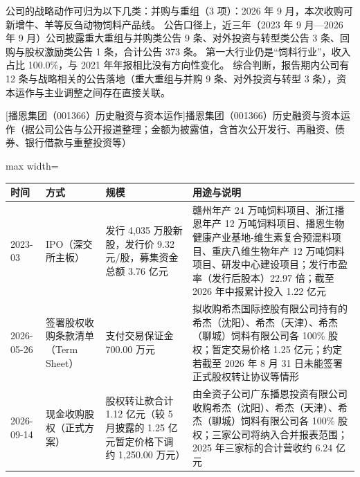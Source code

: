  公司的战略动作可归为以下几类：并购与重组（3 项）：2026 年 9 月，本次收购可新增牛、羊等反刍动物饲料产品线。 公告口径上，近三年（2023 年 9 月---2026 年 9 月）公司披露重大重组与并购类公告 9 条、对外投资与转型类公告 3 条、回购与股权激励类公告 1 条，合计公告 373 条。 第一大行业仍是“饲料行业”，收入占比 100.0\%，与 2021 年年报相比没有方向性变化。 综合判断，报告期内公司有 12 条与战略相关的公告落地（重大重组与并购 9 条、对外投资与转型 3 条），资本运作与主业调整之间存在直接关联。

\begin{center}\small\setlength{\tabcolsep}{4pt}
[播恩集团（001366）历史融资与资本运作]{播恩集团（001366）历史融资与资本运作（据公司公告与公开报道整理；金额为披露值，含首次公开发行、再融资、债券、银行借款与重整投资等）}
\begin{adjustbox}{max width=\textwidth}
\begin{tabular}{@{}p{1.45cm}p{2.55cm}p{4.05cm}p{4.95cm}@{}}
\toprule
时间 & 方式 & 规模 & 用途与说明 \\
\midrule
2023-03 & IPO（深交所主板） & 发行 4,\allowbreak{}035 万股新股，\allowbreak{}发行价 9.32 元/\allowbreak{}股，\allowbreak{}募集资金总额 3.76 亿元 & 赣州年产 24 万吨饲料项目、\allowbreak{}浙江播恩年产 12 万吨饲料项目、\allowbreak{}播恩生物健康产业基地-维生素复合预混料项目、\allowbreak{}重庆八维生物年产 12 万吨饲料项目、\allowbreak{}研发中心建设项目；发行市盈率（发行后股本）22.97 倍；截至 2026 年中报累计投入 1.22 亿元 \\
2026-05-26 & 签署股权收购条款清单（Term Sheet） & 支付交易保证金 700.00 万元 & 拟收购希杰国际控股有限公司持有的希杰（沈阳）、\allowbreak{}希杰（天津）、\allowbreak{}希杰（聊城）饲料有限公司各 100\% 股权；暂定交易价格 1.25 亿元；约定若截至 2026 年 8 月 31 日未能签署正式股权转让协议等情形 \\
2026-09-14 & 现金收购股权（正式方案） & 股权转让款合计 1.12 亿元（较 5 月披露的 1.25 亿元暂定价格下调约 1,\allowbreak{}250.00 万元） & 由全资子公司广东播恩投资有限公司收购希杰（沈阳）、\allowbreak{}希杰（天津）、\allowbreak{}希杰（聊城）饲料有限公司各 100\% 股权；三家公司将纳入合并报表范围；2025 年三家标的合计营收约 6.24 亿元 \\
\bottomrule
\end{tabular}
\end{adjustbox}
\end{center}


